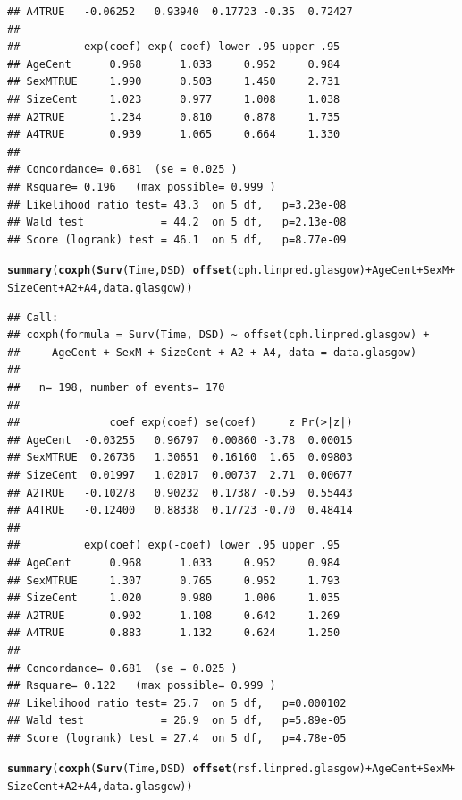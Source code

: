 \documentclass{article}\usepackage[]{graphicx}\usepackage[]{color}
\makeatletter
\newcommand{\hlopt}[1]{\textcolor[rgb]{0,0,0}{#1}}%
\newcommand{\hlstd}[1]{\textcolor[rgb]{0.345,0.345,0.345}{#1}}%
\newcommand{\hlkwd}[1]{\textcolor[rgb]{0.737,0.353,0.396}{\textbf{#1}}}%
\newenvironment{kframe}{%
 \def\at@end@of@kframe{}%
 \ifinner\ifhmode%
  \def\at@end@of@kframe{\end{minipage}}%
  \begin{minipage}{\columnwidth}%
 \fi\fi%
 \def\FrameCommand##1{\hskip\@totalleftmargin \hskip-\fboxsep
 \colorbox{shadecolor}{##1}\hskip-\fboxsep
     \hskip-\linewidth \hskip-\@totalleftmargin \hskip\columnwidth}%
 \MakeFramed {\advance\hsize-\width
   \@totalleftmargin\z@ \linewidth\hsize
   \@setminipage}}%
 {\par\unskip\endMakeFramed%
 \at@end@of@kframe}
\newenvironment{knitrout}{}{} %
\makeatother
\begin{document}
\begin{knitrout}
\begin{kframe}
\begin{verbatim}
## A4TRUE   -0.06252   0.93940  0.17723 -0.35  0.72427
## 
##          exp(coef) exp(-coef) lower .95 upper .95
## AgeCent      0.968      1.033     0.952     0.984
## SexMTRUE     1.990      0.503     1.450     2.731
## SizeCent     1.023      0.977     1.008     1.038
## A2TRUE       1.234      0.810     0.878     1.735
## A4TRUE       0.939      1.065     0.664     1.330
## 
## Concordance= 0.681  (se = 0.025 )
## Rsquare= 0.196   (max possible= 0.999 )
## Likelihood ratio test= 43.3  on 5 df,   p=3.23e-08
## Wald test            = 44.2  on 5 df,   p=2.13e-08
## Score (logrank) test = 46.1  on 5 df,   p=8.77e-09
\end{verbatim}
\begin{alltt}
\hlkwd{summary}\hlstd{(}\hlkwd{coxph}\hlstd{(}\hlkwd{Surv}\hlstd{(Time, DSD)} \hlopt{~} \hlkwd{offset}\hlstd{(cph.linpred.glasgow)} \hlopt{+} \hlstd{AgeCent} \hlopt{+} \hlstd{SexM} \hlopt{+} \hlstd{SizeCent} \hlopt{+} \hlstd{A2} \hlopt{+} \hlstd{A4, data.glasgow))}
\end{alltt}
\begin{verbatim}
## Call:
## coxph(formula = Surv(Time, DSD) ~ offset(cph.linpred.glasgow) + 
##     AgeCent + SexM + SizeCent + A2 + A4, data = data.glasgow)
## 
##   n= 198, number of events= 170 
## 
##              coef exp(coef) se(coef)     z Pr(>|z|)
## AgeCent  -0.03255   0.96797  0.00860 -3.78  0.00015
## SexMTRUE  0.26736   1.30651  0.16160  1.65  0.09803
## SizeCent  0.01997   1.02017  0.00737  2.71  0.00677
## A2TRUE   -0.10278   0.90232  0.17387 -0.59  0.55443
## A4TRUE   -0.12400   0.88338  0.17723 -0.70  0.48414
## 
##          exp(coef) exp(-coef) lower .95 upper .95
## AgeCent      0.968      1.033     0.952     0.984
## SexMTRUE     1.307      0.765     0.952     1.793
## SizeCent     1.020      0.980     1.006     1.035
## A2TRUE       0.902      1.108     0.642     1.269
## A4TRUE       0.883      1.132     0.624     1.250
## 
## Concordance= 0.681  (se = 0.025 )
## Rsquare= 0.122   (max possible= 0.999 )
## Likelihood ratio test= 25.7  on 5 df,   p=0.000102
## Wald test            = 26.9  on 5 df,   p=5.89e-05
## Score (logrank) test = 27.4  on 5 df,   p=4.78e-05
\end{verbatim}
\begin{alltt}
\hlkwd{summary}\hlstd{(}\hlkwd{coxph}\hlstd{(}\hlkwd{Surv}\hlstd{(Time, DSD)} \hlopt{~} \hlkwd{offset}\hlstd{(rsf.linpred.glasgow)} \hlopt{+} \hlstd{AgeCent} \hlopt{+} \hlstd{SexM} \hlopt{+} \hlstd{SizeCent} \hlopt{+} \hlstd{A2} \hlopt{+} \hlstd{A4, data.glasgow))}
\end{alltt}


{\ttfamily\noindent\color{warningcolor}{\#\# Warning in fitter(X, Y, strats, offset, init, control, weights = weights, : Ran out of iterations and did not converge}}

{\ttfamily\noindent\bfseries\color{errorcolor}{\#\# Error in fitter(X, Y, strats, offset, init, control, weights = weights, : NA/NaN/Inf in foreign function call (arg 6)}}\end{kframe}
\end{knitrout}
\end{document}
